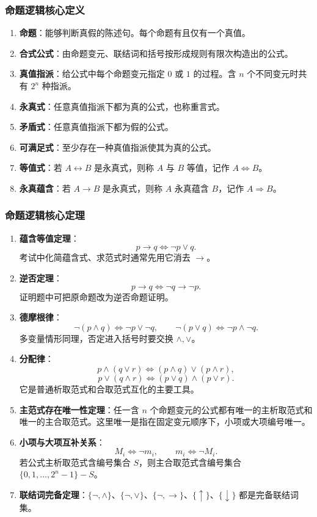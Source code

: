 \subsubsection{命题逻辑核心定义}

\begin{enumerate}
	\item \textbf{命题}：能够判断真假的陈述句。每个命题有且仅有一个真值。
	\item \textbf{合式公式}：由命题变元、联结词和括号按形成规则有限次构造出的公式。
	\item \textbf{真值指派}：给公式中每个命题变元指定 \(0\) 或 \(1\) 的过程。含 \(n\) 个不同变元时共有 \(2^n\) 种指派。
	\item \textbf{永真式}：任意真值指派下都为真的公式，也称重言式。
	\item \textbf{矛盾式}：任意真值指派下都为假的公式。
	\item \textbf{可满足式}：至少存在一种真值指派使其为真的公式。
	\item \textbf{等值式}：若 \(A\leftrightarrow B\) 是永真式，则称 \(A\) 与 \(B\) 等值，记作 \(A\Leftrightarrow B\)。
	\item \textbf{永真蕴含}：若 \(A\to B\) 是永真式，则称 \(A\) 永真蕴含 \(B\)，记作 \(A\Rightarrow B\)。
\end{enumerate}

\subsubsection{命题逻辑核心定理}

\begin{enumerate}
	\item \textbf{蕴含等值定理}：
	\[
	p\to q\Leftrightarrow \neg p\lor q.
	\]
	考试中化简蕴含式、求范式时通常先用它消去 \(\to\)。
	\item \textbf{逆否定理}：
	\[
	p\to q\Leftrightarrow \neg q\to\neg p.
	\]
	证明题中可把原命题改为逆否命题证明。
	\item \textbf{德摩根律}：
	\[
	\neg(p\land q)\Leftrightarrow \neg p\lor\neg q,\qquad
	\neg(p\lor q)\Leftrightarrow \neg p\land\neg q.
	\]
	多变量情形同理，否定进入括号时要交换 \(\land,\lor\)。
	\item \textbf{分配律}：
	\[
	p\land(q\lor r)\Leftrightarrow(p\land q)\lor(p\land r),
	\]
	\[
	p\lor(q\land r)\Leftrightarrow(p\lor q)\land(p\lor r).
	\]
	它是普通析取范式和合取范式互化的主要工具。
	\item \textbf{主范式存在唯一性定理}：任一含 \(n\) 个命题变元的公式都有唯一的主析取范式和唯一的主合取范式。这里唯一是指在固定变元顺序下，小项或大项编号唯一。
	\item \textbf{小项与大项互补关系}：
	\[
	M_i\Leftrightarrow \neg m_i,\qquad m_i\Leftrightarrow \neg M_i.
	\]
	若公式主析取范式含编号集合 \(S\)，则主合取范式含编号集合 \(\{0,1,\dots,2^n-1\}-S\)。
	\item \textbf{联结词完备定理}：\(\{\neg,\land\}\)、\(\{\neg,\lor\}\)、\(\{\neg,\to\}\)、\(\{\uparrow\}\)、\(\{\downarrow\}\) 都是完备联结词集。
\end{enumerate}

